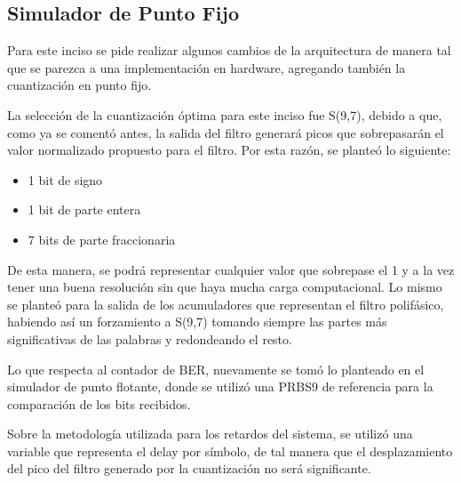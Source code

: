 \documentclass[12pt, a4paper]{article}
\begin{document}
    \subsection{Simulador de Punto Fijo}
    Para este inciso se pide realizar algunos cambios de la arquitectura de manera tal
    que se parezca a una implementación en hardware, agregando también la cuantización en punto fijo.
    
    La selección de la cuantización óptima para este inciso fue S(9,7), debido a que, como ya se comentó antes,
    la salida del filtro generará picos que sobrepasarán el valor normalizado propuesto para el filtro.
    Por esta razón, se planteó lo siguiente:
    \begin{itemize}
        \item 1 bit de signo
        \item 1 bit de parte entera
        \item 7 bits de parte fraccionaria
    \end{itemize}
    De esta manera, se podrá representar cualquier valor que sobrepase el 1 y a la vez tener una buena resolución sin
    que haya mucha carga computacional.
    Lo mismo se planteó para la salida de los acumuladores que representan el filtro polifásico, habiendo así un forzamiento
    a S(9,7) tomando siempre las partes más significativas de las palabras y redondeando el resto.

    Lo que respecta al contador de BER, nuevamente se tomó lo planteado en el simulador de punto flotante, donde se utilizó
    una PRBS9 de referencia para la comparación de los bits recibidos.

    Sobre la metodología utilizada para los retardos del sistema, se utilizó una variable que representa el delay por símbolo,
    de tal manera que el desplazamiento del pico del filtro generado por la cuantización no será significante.
\end{document}
